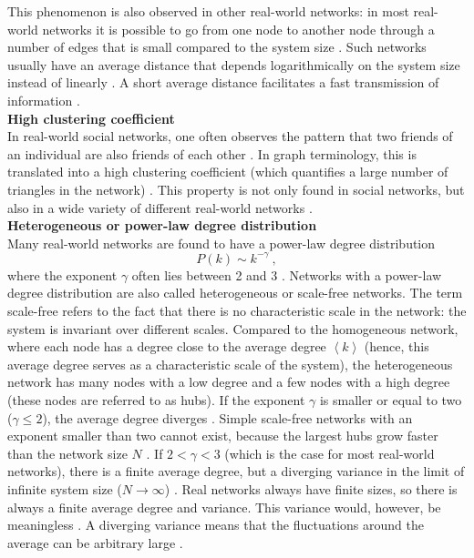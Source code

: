 \documentclass[11 pt , letterpaper , twoside , openright]{book}
\begin{document}
\newline
This phenomenon is also observed in other real-world networks: in most real-world networks it is possible to go from one node to another node through a number of edges that is small compared to the system size \cite{RealWorld}. Such networks usually have an average distance that depends logarithmically on the system size instead of linearly \cite{Newman2003}. A short average distance facilitates a fast transmission of information \cite{Newman2003}\cite{Zhang2014}.\\
\newline
\textbf{High clustering coefficient}\\
\newline
In real-world social networks, one often observes the pattern that two friends of an individual are also friends of each other \cite{RealWorld}. In graph terminology, this is translated into a high clustering coefficient (which quantifies a large number of triangles in the network) \cite{RealWorld}. This property is not only found in social networks, but also in a wide variety of different real-world networks \cite{RealWorld}.\\
\newline
\textbf{Heterogeneous or power-law degree distribution}\\
\newline
Many real-world networks are found to have a power-law degree distribution
\begin{equation}
	P(k) \sim k^{-\gamma} \ ,
\end{equation}
where the exponent $\gamma$ often lies between 2 and 3 \cite{RealWorld}. Networks with a power-law degree distribution are also called heterogeneous or scale-free networks. The term scale-free refers to the fact that there is no characteristic scale in the network: the system is invariant over different scales. Compared to the homogeneous network, where each node has a degree close to the average degree $\left<k\right>$ (hence, this average degree serves as a characteristic scale of the system), the heterogeneous network has many nodes with a low degree and a few nodes with a high degree (these nodes are referred to as hubs). If the exponent $\gamma$ is smaller or equal to two ($\gamma \leqslant 2$), the average degree diverges \cite{Newman2005}. Simple scale-free networks with an exponent smaller than two cannot exist, because the largest hubs grow faster than the network size $N$ \cite{Barabasi2016}. If $2 < \gamma < 3$ (which is the case for most real-world networks), there is a finite average degree, but a diverging variance in the limit of infinite system size ($N \rightarrow \infty$) \cite{Newman2005}. Real networks always have finite sizes, so there is always a finite average degree and variance. This variance would, however, be meaningless \cite{Newman2005}. A diverging variance means that the fluctuations around the average can be arbitrary large \cite{Barabasi2016}.\\
\end{document}
